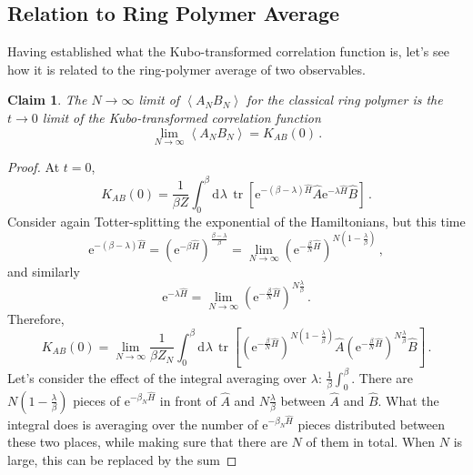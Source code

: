 \documentclass{article}
\theoremstyle{plain}\theoremheaderfont{\normalfont\itshape}\theorembodyfont{\rmfamily}\theoremseparator{.}\newtheorem*{rem}{Remark}\newtheorem*{ex}{Example}\newtheorem*{proof}{Proof}\newtheorem*{altp}{Alternative proof}
\theoremstyle{plain}\theoremheaderfont{\normalfont\bfseries}\theorembodyfont{\rmfamily}\theoremseparator{.}\newtheorem{thm}{Theorem}[section]\newtheorem{lem}[thm]{Lemma}\newtheorem{prop}[thm]{Proposition}\newtheorem*{cor}{Corollary}\newtheorem{defn}[thm]{Definition}\newtheorem{clm}[thm]{Claim}\newtheorem{clminproof}{Claim}
\theoremstyle{break}\theoremheaderfont{\normalfont\itshape}\theorembodyfont{\rmfamily}\theoremseparator{.\medskip}\newtheorem*{proofskip}{Proof}\newtheorem*{exs}{Examples}\newtheorem*{rems}{Remarks}
\theoremstyle{break}\theoremheaderfont{\normalfont\bfseries}\theorembodyfont{\rmfamily}\theoremseparator{.\medskip}\newtheorem{lemskip}[thm]{Lemma}\newtheorem{defnskip}[thm]{Definition}\newtheorem{propskip}[thm]{Proposition}\newtheorem{thmskip}[thm]{Theorem}
\numberwithin{equation}{section}
\newcommand{\ee}{\mathrm{e}}
\newcommand{\dd}[2][]{\mathrm{d}^{#1} #2\,}
\newcommand{\eval}[1]{\left\langle #1 \right\rangle}
\DeclareMathOperator{\tr}{tr}
\begin{document}
    \subsection{Relation to Ring Polymer Average}

    Having established what the Kubo-transformed correlation function is, let's see how it is related to the ring-polymer average of two observables.
    \begin{clm}
        The \(N\to\infty\) limit of \(\eval{A_N B_N}\) for the classical ring polymer is the \(t\to 0\) limit of the Kubo-transformed correlation function
        \begin{equation}
            \lim_{N\to\infty}\eval{A_N B_N}=K_{AB}(0)\,.
        \end{equation}
    \end{clm}
    \begin{proof}
        At \(t=0\),
        \begin{equation}
            K_{AB}(0)=\frac{1}{\beta Z}\int_{0}^{\beta}\dd{\lambda}\tr[\ee^{-(\beta-\lambda)\hat{H}}\hat{A}\ee^{-\lambda\hat{H}}\hat{B}]\,.
        \end{equation}
        Consider again Totter-splitting the exponential of the Hamiltonians, but this time
        \begin{equation}
            \ee^{-(\beta-\lambda)\hat{H}}=\left(\ee^{-\beta\hat{H}}\right)^{\frac{\beta-\lambda}{\beta}}=\lim_{N\to\infty}\left(\ee^{-\frac{\beta}{N}\hat{H}}\right)^{N(1-\frac{\lambda}{\beta})}\,,
        \end{equation}
        and similarly
        \begin{equation}
            \ee^{-\lambda\hat{H}}=\lim_{N\to\infty}\left(\ee^{-\frac{\beta}{N}\hat{H}}\right)^{N\frac{\lambda}{\beta}}\,.
        \end{equation}
        Therefore,
        \begin{equation}
            K_{AB}(0)=\lim_{N\to\infty}\frac{1}{\beta Z_N}\int_{0}^{\beta}\dd{\lambda}\tr\left[\left(\ee^{-\frac{\beta}{N}\hat{H}}\right)^{N(1-\frac{\lambda}{\beta})}\hat{A}\left(\ee^{-\frac{\beta}{N}\hat{H}}\right)^{N\frac{\lambda}{\beta}}\hat{B}\right]\,.
        \end{equation}
        Let's consider the effect of the integral averaging over \(\lambda\): \(\frac{1}{\beta}\int_{0}^{\beta}\). There are \(N(1-\frac{\lambda}{\beta})\) pieces of \(\ee^{-\beta_N \hat{H}}\) in front of \(\hat{A}\) and \(N\frac{\lambda}{\beta}\) between \(\hat{A}\) and \(\hat{B}\). What the integral does is averaging over the number of \(\ee^{-\beta_N \hat{H}}\) pieces distributed between these two places, while making sure that there are \(N\) of them in total. When \(N\) is large, this can be replaced by the sum

\end{proof}
\end{document}
